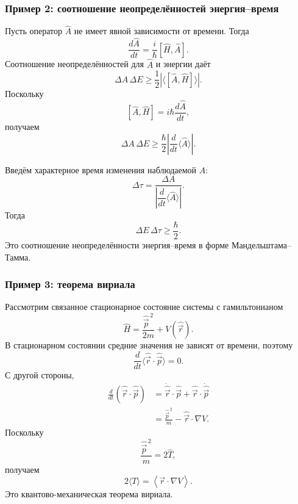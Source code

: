 \documentclass[12pt,a4paper]{article}
\begin{document}
\subsubsection{Пример 2: соотношение неопределённостей энергия--время}

Пусть оператор $\hat A$ не имеет явной зависимости от времени. Тогда
\[
    \frac{d\hat A}{dt}
    =
    \frac{i}{\hbar}[\hat H,\hat A].
\]
Соотношение неопределённостей для $\hat A$ и энергии даёт
\[
    \Delta A\,\Delta E
    \geq
    \frac12
    \left|
        \langle[\hat A,\hat H]\rangle
    \right|.
\]
Поскольку
\[
    [\hat A,\hat H]
    =
    i\hbar\frac{d\hat A}{dt},
\]
получаем
\[
    \boxed{
        \Delta A\,\Delta E
        \geq
        \frac{\hbar}{2}
        \left|
            \frac{d}{dt}
            \langle\hat A\rangle
        \right|
    }.
\]

Введём характерное время изменения наблюдаемой $\hat A$:
\[
    \boxed{
        \Delta\tau
        =
        \frac{\Delta A}
        {
            \left|
                \dfrac{d}{dt}
                \langle\hat A\rangle
            \right|
        }
    }.
\]
Тогда
\[
    \boxed{
        \Delta E\,\Delta\tau
        \geq
        \frac{\hbar}{2}
    }.
\]
Это соотношение неопределённости энергия--время в форме
Мандельштама--Тамма.


\subsubsection{Пример 3: теорема вириала}

Рассмотрим связанное стационарное состояние системы с гамильтонианом
\[
    \hat H
    =
    \frac{\hat{\vec p}^{\,2}}{2m}
    +
    V(\hat{\vec r}).
\]
В стационарном состоянии средние значения не зависят от времени, поэтому
\[
    \frac{d}{dt}
    \langle
        \hat{\vec r}\cdot\hat{\vec p}
    \rangle
    =
    0.
\]
С другой стороны,
\[
\begin{aligned}
    \frac{d}{dt}
    (\hat{\vec r}\cdot\hat{\vec p})
    &=
    \dot{\hat{\vec r}}\cdot\hat{\vec p}
    +
    \hat{\vec r}\cdot\dot{\hat{\vec p}}
    \\
    &=
    \frac{\hat{\vec p}^{\,2}}{m}
    -
    \hat{\vec r}\cdot\nabla V.
\end{aligned}
\]
Поскольку
\[
    \frac{\hat{\vec p}^{\,2}}{m}=2\hat T,
\]
получаем
\[
    \boxed{
        2\langle T\rangle
        =
        \left\langle
            \vec r\cdot\nabla V
        \right\rangle
    }.
\]
Это квантово-механическая теорема вириала.
\end{document}
